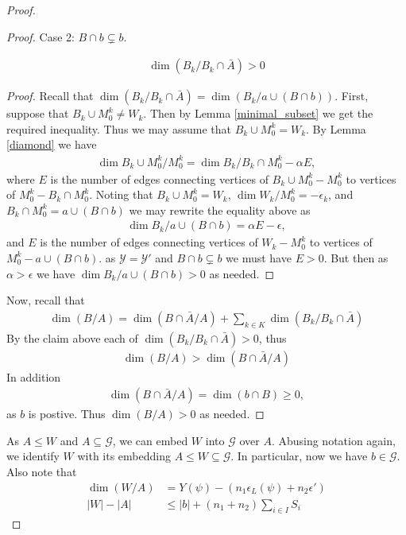 \documentclass{amsart}
\newcommand{\GG}{\mathcal G}
\newcommand{\Y}{\mathcal Y}
\newcommand{\paren}[1]{\left(#1\right)}
\begin{document}
\begin{proof}
\begin{proof}
    Case 2: $B \cap b \subsetneq b$.
    \begin{Claim}
    \begin{align*}
      \dim(B_k / B_k \cap \bar A) > 0
    \end{align*}
    \end{Claim}
    \begin{proof}
      Recall that $\dim(B_k / B_k \cap \bar A) = \dim(B_k / a \cup (B \cap b))$.
      First, suppose that $B_k \cup M_0^k \neq W_k$.
      Then by Lemma \ref{minimal_subset} we get the required inequality.
      Thus we may assume that $B_k \cup M_0^k = W_k$.
      By Lemma \ref{diamond} we have
      \begin{align*}
        \dim{B_k \cup M_0^k / M_0^k} = \dim{B_k / B_k \cap M_0^k} - \alpha E,
      \end{align*}
      where $E$ is the number of edges connecting vertices of $B_k \cup M_0^k - M_0^k$ to vertices of $M_0^k - B_k \cap M_0^k$.
      Noting that $B_k \cup M_0^k = W_k$, $\dim{W_k / M_0^k} = -\epsilon_k$, and $B_k \cap M_0^k = a \cup (B \cap b)$
      we may rewrite the equality above as
      \begin{align*}
        \dim{B_k / a \cup (B \cap b)} = \alpha E - \epsilon,
      \end{align*}
      and $E$ is the number of edges connecting vertices of $W_k - M_0^k$ to vertices of $M_0^k - a \cup (B \cap b)$.
      as $\Y = \Y'$ and $B \cap b \subsetneq b$ we must have $E > 0$.
      But then as $\alpha > \epsilon$ we have $\dim{B_k / a \cup (B \cap b)} > 0$ as needed.
    \end{proof}
    Now, recall that
    \begin{align*}
      \dim(B/A) = \dim(B \cap \bar A / A) + \sum_{k \in K} \dim(B_k/ B_k \cap \bar A)
    \end{align*}
    By the claim above each of $\dim(B_k/ B_k \cap \bar A) > 0$, thus
    \begin{align*}
      \dim(B/A) > \dim(B \cap \bar A / A)
    \end{align*}
    In addition
    \begin{align*}
      \dim(B \cap \bar A / A) = \dim (b \cap B) \geq 0,
    \end{align*}
    as $b$ is postive.
    Thus $\dim (B/A) > 0$ as needed.
  \end{proof}

  As $A \leq W$ and $A \subseteq \GG$, we can embed $W$ into $\GG$ over $A$.
  Abusing notation again, we identify $W$ with its embedding $A \leq W \subseteq \GG$.
  In particular, now we have $b \in \GG$.
  Also note that
  \begin{align*}
    \dim(W/A) &= Y(\psi) - \paren{n_1 \epsilon_L(\psi) + n_2 \epsilon'} \\
    |W| - |A| &\leq |b| + (n_1 + n_2) \sum_{i \in I} S_i
  \end{align*}


\end{proof}
\end{document}
